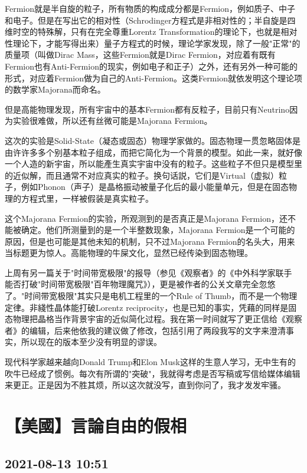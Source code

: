 \documentclass[twocolumn]{ctexart}
\begin{document}
Fermion就是半自旋的粒子，所有物质的构成成分都是Fermion，例如质子、中子和电子。但是在写出它的相对性（Schrodinger方程式是非相对性的；半自旋是四维时空的特殊解，只有在完全尊重Lorentz Transformation的理论下，也就是相对性理论下，才能写得出来）量子方程式的时候，理论学家发现，除了一般"正常"的质量项（叫做Dirac Mass，这些Fermion就是Dirac Fermion，对应着有既有Fermion也有Anti-Fermion的现实，例如电子和正子）之外，还有另外一种可能的形式，对应着Fermion做为自己的Anti-Fermion。这类Fermion就依发明这个理论项的数学家Majorana而命名。

但是高能物理发现，所有宇宙中的基本Fermion都有反粒子，目前只有Neutrino因为实验很难做，所以还有丝微可能是Majorana Fermion。

这次的实验是Solid-State（凝态或固态）物理学家做的。固态物理一贯忽略固体是由许许多多个别基本粒子组成，而把它简化为一个背景的模型。如此一来，就好像一个人造的新宇宙，所以能產生真实宇宙中没有的粒子。这些粒子不但只是模型里的近似解，而且通常不对应真实的粒子。换句话説，它们是Virtual（虚拟）粒子，例如Phonon（声子）是晶格振动被量子化后的最小能量单元，但是在固态物理的方程式里，一样被假装是真实粒子。

这个Majorana Fermion的实验，所观测到的是否真正是Majorana Fermion，还不能被确定。他们所测量到的是一个半整数现象，Majorana Fermion是一个可能的原因，但是也可能是其他未知的机制，只不过Majorana Fermion的名头大，用来当标题更为惊人。高能物理的牛屎文化，显然已经传染到固态物理。

上周有另一篇关于"时间带宽极限"的报导（参见《观察者》的《中外科学家联手 能否打破"时间带宽极限"百年物理魔咒》），更是被作者的公关文章完全忽悠了。"时间带宽极限"其实只是电机工程里的一个Rule of Thumb，而不是一个物理定律。非綫性晶体能打破Lorentz reciprocity，也是已知的事实，凭藉的同样是固态物理把晶格当作背景宇宙的近似简化过程。我在第一时间就写了更正信给《观察者》的编辑，后来他依我的建议做了修改，包括引用了两段我写的文字来澄清事实，所以现在的版本至少没有明显的谬误。

现代科学家越来越向Donald Trump和Elon Musk这样的生意人学习，无中生有的吹牛已经成了惯例。每次有所谓的"突破"，我就得考虑是否写稿或写信给媒体编辑来更正。正是因为不胜其烦，所以这次就没写，直到你问了，我才发发牢骚。\section*{【美國】言論自由的假相}
\subsection*{2021-08-13 10:51}
\end{document}

